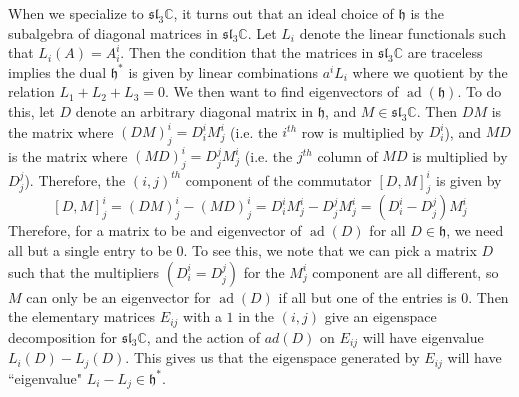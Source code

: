 \documentclass[psamsfonts]{amsart}
\theoremstyle{definition}
\theoremstyle{remark}
\renewcommand{\sl}{\mathfrak{sl}}
\newcommand{\C}{\mathbb{C}}
\newcommand{\h}{\mathfrak{h}}
\DeclareMathOperator{\ad}{ad}
\begin{document}
When we specialize to $\sl_3\C$, it turns out that an ideal choice of $\h$ is
the subalgebra of diagonal matrices in $\sl_3\C$. Let $L_i$ denote the linear
functionals such that $L_i(A) = A^i_i$. Then the condition that the matrices
in $\sl_3\C$ are traceless implies the dual $\h^*$ is given by linear
combinations $a^iL_i$ where we quotient by the relation $L_1 + L_2 + L_3 = 0$.
We then want to find eigenvectors of $\ad(\h)$. To do this, let $D$ denote
an arbitrary diagonal matrix in $\h$, and $M \in \sl_3\C$. Then $DM$ is the
matrix where $(DM)^i_j = D^i_iM^i_j$ (i.e. the $i^{th}$ row is multiplied by
$D^i_i$), and $MD$ is the matrix where $(MD)^i_j = D^j_jM^i_j$ (i.e. the $j^{th}$
column of $MD$ is multiplied by $D^j_j$). Therefore, the $(i,j)^{th}$ component
of the commutator $[D,M]^i_j$ is given by
\[
[D,M]^i_j = (DM)^i_j - (MD)^i_j = D^i_iM^i_j - D^j_jM^i_j = (D^i_i - D^j_j)M^i_j
\]
Therefore, for a matrix to be and eigenvector of $\ad(D)$ for all $D \in \h$, we
need all but a single entry to be $0$. To see this, we note that we can pick
a matrix $D$ such that the multipliers $(D^i_i = D^j_j)$ for the $M^i_j$
component are all different, so $M$ can only be an eigenvector for $\ad(D)$
if all but one of the entries is $0$. Then the elementary matrices $E_{ij}$ with
a $1$ in the $(i,j)$ give an eigenspace decomposition for $\sl_3\C$, and the
action of $ad(D)$ on $E_{ij}$ will have eigenvalue $L_i(D) - L_j(D)$. This gives
us that the eigenspace generated by $E_{ij}$ will have ``eigenvalue"
$L_i - L_j \in \h^*$.
%
\iffalse
\center
\scalebox{3}{
  \begin{tikzpicture}[baseline=-.5]
  \begin{rootSystem}{A}
  \roots
  \end{rootSystem}
  \end{tikzpicture}
}
\fi
%
\end{document}
